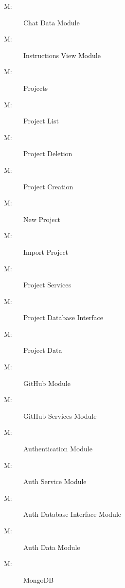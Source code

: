 \documentclass[12pt, titlepage]{article}
\newcounter{mnum}
\newcommand{\mthemnum}{M\themnum}
\begin{document}
\begin{description}
		\item [ \mthemnum: \label{m22}] Chat Data Module
		\item [ \mthemnum: \label{m23}] Instructions View Module
		\item [ \mthemnum: \label{m24}] Projects
		\item [ \mthemnum: \label{m25}] Project List
		\item [ \mthemnum: \label{m26}] Project Deletion
		\item [ \mthemnum: \label{m27}] Project Creation
		\item [ \mthemnum: \label{m28}] New Project
		\item [ \mthemnum: \label{m29}] Import Project
		\item [ \mthemnum: \label{m30}] Project Services
		\item [ \mthemnum: \label{m31}] Project Database Interface
		\item [ \mthemnum: \label{m32}] Project Data
		\item [ \mthemnum: \label{m33}] GitHub Module
		\item [ \mthemnum: \label{m34}] GitHub Services Module
		\item [ \mthemnum: \label{m35}] Authentication Module
		\item [ \mthemnum: \label{m36}] Auth Service Module
		\item [ \mthemnum: \label{m37}] Auth Database Interface Module
		\item [ \mthemnum: \label{m38}] Auth Data Module
		\item [ \mthemnum: \label{m39}] MongoDB
	\end{description}
	
\end{document}
